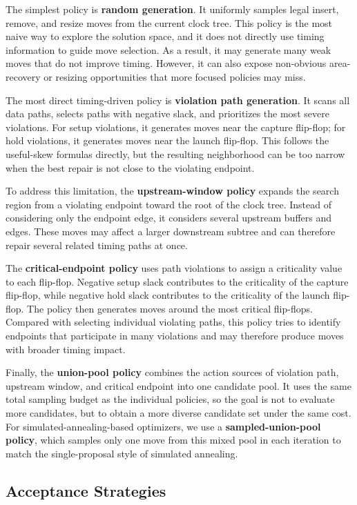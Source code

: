 \documentclass{article}
\begin{document}
The simplest policy is \textbf{random generation}. It uniformly samples legal insert, remove, and resize moves from the current clock tree. This policy is the most naive way to explore the solution space, and it does not directly use timing information to guide move selection. As a result, it may generate many weak moves that do not improve timing. However, it can also expose non-obvious area-recovery or resizing opportunities that more focused policies may miss.

The most direct timing-driven policy is \textbf{violation path generation}. It scans all data paths, selects paths with negative slack, and prioritizes the most severe violations. For setup violations, it generates moves near the capture flip-flop; for hold violations, it generates moves near the launch flip-flop. This follows the useful-skew formulas directly, but the resulting neighborhood can be too narrow when the best repair is not close to the violating endpoint.

To address this limitation, the \textbf{upstream-window policy} expands the search region from a violating endpoint toward the root of the clock tree. Instead of considering only the endpoint edge, it considers several upstream buffers and edges. These moves may affect a larger downstream subtree and can therefore repair several related timing paths at once.

The \textbf{critical-endpoint policy} uses path violations to assign a criticality value to each flip-flop. Negative setup slack contributes to the criticality of the capture flip-flop, while negative hold slack contributes to the criticality of the launch flip-flop. The policy then generates moves around the most critical flip-flops. Compared with selecting individual violating paths, this policy tries to identify endpoints that participate in many violations and may therefore produce moves with broader timing impact.

Finally, the \textbf{union-pool policy} combines the action sources of violation path, upstream window, and critical endpoint into one candidate pool. It uses the same total sampling budget as the individual policies, so the goal is not to evaluate more candidates, but to obtain a more diverse candidate set under the same cost. For simulated-annealing-based optimizers, we use a \textbf{sampled-union-pool policy}, which samples only one move from this mixed pool in each iteration to match the single-proposal style of simulated annealing.

\subsection{Acceptance Strategies}
\end{document}
